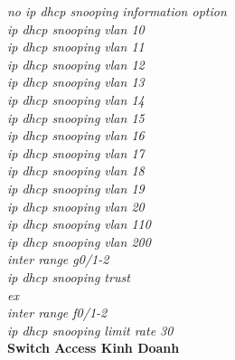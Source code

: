 \documentclass[12pt,a4paper]{report}
\begin{document}
\hspace*{2cm}\textit{no ip dhcp snooping information option\\
\hspace*{2cm}ip dhcp snooping vlan 10\\
\hspace*{2cm}ip dhcp snooping vlan 11\\
\hspace*{2cm}ip dhcp snooping vlan 12\\
\hspace*{2cm}ip dhcp snooping vlan 13\\
\hspace*{2cm}ip dhcp snooping vlan 14\\
\hspace*{2cm}ip dhcp snooping vlan 15\\
\hspace*{2cm}ip dhcp snooping vlan 16\\
\hspace*{2cm}ip dhcp snooping vlan 17\\
\hspace*{2cm}ip dhcp snooping vlan 18\\
\hspace*{2cm}ip dhcp snooping vlan 19\\
\hspace*{2cm}ip dhcp snooping vlan 20\\
\hspace*{2cm}ip dhcp snooping vlan 110\\
\hspace*{2cm}ip dhcp snooping vlan 200\\
\hspace*{2cm}inter range g0/1-2\\
\hspace*{2cm}ip dhcp snooping trust\\
\hspace*{2cm}ex\\
\hspace*{2cm}inter range f0/1-2\\
\hspace*{2cm}ip dhcp snooping limit rate 30\\}
\hspace*{1cm}\textbf{Switch Access Kinh Doanh}\\
\end{document}
